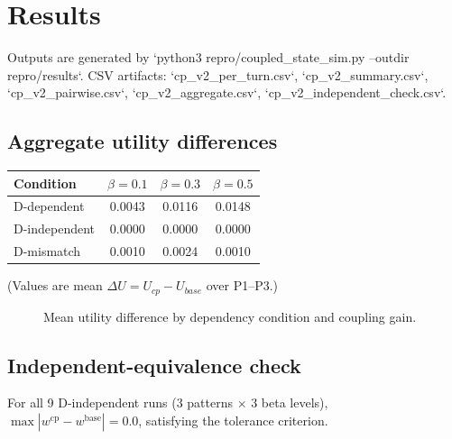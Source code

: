 \documentclass[11pt,a4paper]{article}
\begin{document}
\section{Results}
Outputs are generated by `python3 repro/coupled\_state\_sim.py --outdir repro/results`.
CSV artifacts:
`cp\_v2\_per\_turn.csv`, `cp\_v2\_summary.csv`, `cp\_v2\_pairwise.csv`, `cp\_v2\_aggregate.csv`, `cp\_v2\_independent\_check.csv`.

\subsection{Aggregate utility differences}
\begin{center}
\begin{tabular}{@{}lccc@{}}
\toprule
Condition & $\beta=0.1$ & $\beta=0.3$ & $\beta=0.5$ \\
\midrule
D-dependent   & 0.0043 & 0.0116 & 0.0148 \\
D-independent & 0.0000 & 0.0000 & 0.0000 \\
D-mismatch    & 0.0010 & 0.0024 & 0.0010 \\
\bottomrule
\end{tabular}
\end{center}
(Values are mean \(\Delta U=U_{cp}-U_{base}\) over P1--P3.)

\begin{figure}[t]
\centering
{}
\caption{Mean utility difference by dependency condition and coupling gain.}
\label{fig:udiff}
\end{figure}

\subsection{Independent-equivalence check}
For all 9 D-independent runs (3 patterns $\times$ 3 beta levels),
\(\max|w^{\mathrm{cp}}-w^{\mathrm{base}}|=0.0\), satisfying the tolerance criterion.
\end{document}
